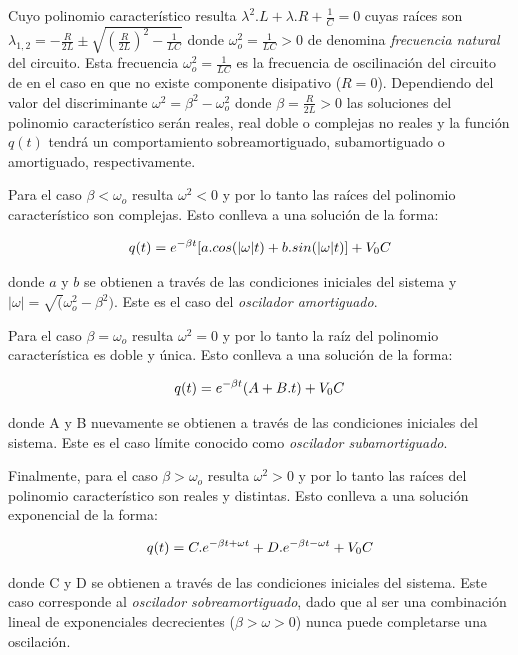 \documentclass[11pt,a4paper]{article}
\begin{document}
Cuyo polinomio característico resulta $\lambda^2.L+\lambda.R+\frac{1}{C} = 0$ cuyas raíces son $\lambda_{1,2} = -\frac{R}{2L} \pm \sqrt{(\frac{R}{2L})^2-\frac{1}{LC}}$ donde $\omega_o^2 = \frac{1}{LC}>0$ de denomina \textit{frecuencia natural} del circuito. Esta frecuencia $\omega_o^2 = \frac{1}{LC}$ es la frecuencia de oscilinación del circuito de en el caso en que no existe componente disipativo ($R=0$). Dependiendo del valor del discriminante $\omega^2 = \beta^2-\omega_o^2$ donde $\beta = \frac{R}{2L}>0$ las soluciones del polinomio característico serán reales, real doble o complejas no reales y la función $q(t)$ tendrá un comportamiento sobreamortiguado, subamortiguado o amortiguado, respectivamente. 

Para el caso $\beta < \omega_o$ resulta $\omega^2 < 0$ y por lo tanto las raíces del polinomio característico son complejas. Esto conlleva a una solución de la forma:

\begin{equation}{\label{amort}}
q(t) = e^{-\beta t}[a.cos(|\omega| t)+b.sin(|\omega| t)] + V_0C
\end{equation}

donde $a$ y $b$ se obtienen a través de las condiciones iniciales del sistema y $|\omega| = \sqrt(\omega_o^2-\beta^2)$. Este es el caso del \textit{oscilador amortiguado}.

Para el caso $\beta = \omega_o$ resulta $\omega^2 = 0$ y por lo tanto la raíz del polinomio característica es doble y única. Esto conlleva a una solución de la forma:

\begin{equation}{\label{sub}}
q(t) = e^{-\beta t}(A+B.t) + V_0C
\end{equation}

donde A y B nuevamente se obtienen a través de las condiciones iniciales del sistema. Este es el caso límite conocido como \textit{oscilador subamortiguado}.

Finalmente, para el caso $\beta > \omega_o$ resulta $\omega^2>0$ y por lo tanto las raíces del polinomio característico son reales y distintas. Esto conlleva a una solución exponencial de la forma:

\begin{equation}{\label{sobre}}
q(t) = C.e^{-\beta t + \omega t} + D.e^{-\beta t - \omega t} + V_0C
\end{equation}

donde C y D se obtienen a través de las condiciones iniciales del sistema. Este caso corresponde al \textit{oscilador sobreamortiguado}, dado que al ser una combinación lineal de exponenciales decrecientes ($\beta > \omega > 0$) nunca puede completarse una oscilación. 
\end{document}

